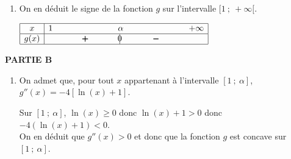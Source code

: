 \begin{enumerate}
\begin{enumerate}
$\left .
\begin{array}{l !{\approx} l}
g(1,89) & 0,024>0\\
g(1.90) &  -0,024<0
\end{array}		
\right \}$ donc $\alpha \in\;[1,89\;; 1,90]$			
	\end{enumerate}

\item On en déduit le signe de la fonction $g$ sur l'intervalle $[1~;~+\infty[$.

\begin{center}
\renewcommand{\arraystretch}{1.3}
\def\esp{\hspace*{2cm}}
$\begin{array}{|c | *{5}{c} |} 
\hline
x  & 1 & \esp & \alpha & \esp  & +\infty \\
\hline
g(x) &  & \pmb{+} &  \vline\hspace{-2.7pt}{0} & \pmb{-} &    \\
\hline
\end{array}$
\renewcommand{\arraystretch}{1}
\end{center}

\end{enumerate}

\medskip

\textbf{PARTIE B}

\medskip

\begin{enumerate}
\item On admet que, pour tout $x$ appartenant à l'intervalle $[1~;~\alpha]$, $g''(x) = - 4[\ln (x) + 1]$.


Sur $[1~;~\alpha]$, $\ln(x)\geqslant 0$ donc $\ln(x)+1>0$ donc $-4\left (\ln(x)+1\right )<0$. \\
On en déduit que $g''(x)>0$ et donc que la fonction $g$ est concave sur $[1~;~\alpha]$.
\end{enumerate}



